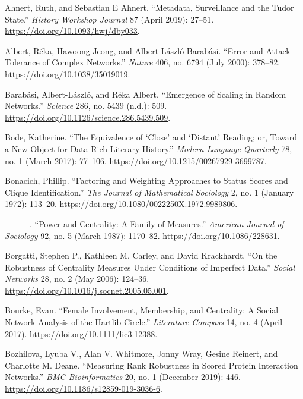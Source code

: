 \documentclass[]{article}
\begin{document}
\leavevmode\hypertarget{ref-ahnert_metadata_2019}{}%
Ahnert, Ruth, and Sebastian E Ahnert. ``Metadata, Surveillance and the Tudor State.'' \emph{History Workshop Journal} 87 (April 2019): 27--51. \url{https://doi.org/10.1093/hwj/dby033}.

\leavevmode\hypertarget{ref-albert_error_2000}{}%
Albert, Réka, Hawoong Jeong, and Albert-László Barabási. ``Error and Attack Tolerance of Complex Networks.'' \emph{Nature} 406, no. 6794 (July 2000): 378--82. \url{https://doi.org/10.1038/35019019}.

\leavevmode\hypertarget{ref-barabasi_emergence_1999}{}%
Barabási, Albert-László, and Réka Albert. ``Emergence of Scaling in Random Networks.'' \emph{Science} 286, no. 5439 (n.d.): 509. \url{https://doi.org/10.1126/science.286.5439.509}.

\leavevmode\hypertarget{ref-bode_equivalence_2017}{}%
Bode, Katherine. ``The Equivalence of `Close' and `Distant' Reading; or, Toward a New Object for Data-Rich Literary History.'' \emph{Modern Language Quarterly} 78, no. 1 (March 2017): 77--106. \url{https://doi.org/10.1215/00267929-3699787}.

\leavevmode\hypertarget{ref-bonacich_factoring_1972}{}%
Bonacich, Phillip. ``Factoring and Weighting Approaches to Status Scores and Clique Identification.'' \emph{The Journal of Mathematical Sociology} 2, no. 1 (January 1972): 113--20. \url{https://doi.org/10.1080/0022250X.1972.9989806}.

\leavevmode\hypertarget{ref-bonacich_power_1987}{}%
---------. ``Power and Centrality: A Family of Measures.'' \emph{American Journal of Sociology} 92, no. 5 (March 1987): 1170--82. \url{https://doi.org/10.1086/228631}.

\leavevmode\hypertarget{ref-borgatti_robustness_2006}{}%
Borgatti, Stephen P., Kathleen M. Carley, and David Krackhardt. ``On the Robustness of Centrality Measures Under Conditions of Imperfect Data.'' \emph{Social Networks} 28, no. 2 (May 2006): 124--36. \url{https://doi.org/10.1016/j.socnet.2005.05.001}.

\leavevmode\hypertarget{ref-bourke_female_2017}{}%
Bourke, Evan. ``Female Involvement, Membership, and Centrality: A Social Network Analysis of the Hartlib Circle.'' \emph{Literature Compass} 14, no. 4 (April 2017). \url{https://doi.org/10.1111/lic3.12388}.

\leavevmode\hypertarget{ref-bozhilova_measuring_2019}{}%
Bozhilova, Lyuba V., Alan V. Whitmore, Jonny Wray, Gesine Reinert, and Charlotte M. Deane. ``Measuring Rank Robustness in Scored Protein Interaction Networks.'' \emph{BMC Bioinformatics} 20, no. 1 (December 2019): 446. \url{https://doi.org/10.1186/s12859-019-3036-6}.
\end{document}
